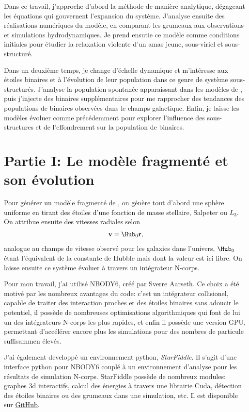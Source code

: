 Dans ce travail, j'approche d'abord la m\'ethode de mani\`ere analytique, d\'egageant les \'equations qui gouvernent l'expansion du syst\`eme. J'analyse ensuite des r\'ealisations num\'eriques du mod\`ele, en comparant les grumeaux aux observations et simulations hydrodynamiques. Je prend ensutie ce mod\`ele comme conditions initiales pour \'etudier la relaxation violente d'un amas jeune, sous-viriel et sous-structur\'e.

Dans un deuxi\`eme temps, je change d'\'echelle dynamique et m'int\'eresse aux \'etoiles binaires et \`a l'\'evolution de leur population dans ce genre de syst\`eme sous-structur\'es. J'analyse la population spontan\'ee apparaissant dans les mod\`eles de \HubLem, puis j'injecte des binaires suppl\'ementaires pour me rapprocher des tendances des populations de binaires observ\'ees dans le champs galactique. Enfin, je laisse les mod\`eles \'evoluer comme pr\'ec\'edemment pour explorer l'influence des sous-structures et de l'effondrement sur la population de binaires.


\section{Partie I: Le mod\`ele fragment\'e et son \'evolution}


Pour g\'en\'erer un mod\`ele fragment\'e de \HubLem, on g\'en\`ere tout d'abord une sph\`ere uniforme en tirant des \'etoiles d'une fonction de masse stellaire, Salpeter ou $L_3$. On attribue ensuite des vitesses radiales selon
\begin{equation}
\bold{v} = \Hub_0 \bold{r},
\end{equation}
analogue au champs de vitesse observ\'e pour les galaxies dans l'univers, $\Hub_0$ \'etant l'\'equivalent de la constante de Hubble mais dont la valeur est ici libre. On laisse ensuite ce syst\`eme \'evoluer \`a travers un int\'egrateur N-corps.

Pour mon travail, j'ai utilis\'e NBODY6, cr\'e\'e par Sverre Aarseth. Ce choix a \'et\'e motiv\'e par les nombreux avantages du code: c'est un int\'egrateur collisionel, capable de traiter des interaction proches et des \'etoiles binaires sans adoucir le potentiel, il poss\`ede de nombreuses optimisations algorithmiques qui font de lui un des int\'egrateurs N-corps les plus rapides, et enfin il poss\`ede une version GPU, permettant d'acc\'el\'erer encore plus les simulations pour des nombres de particule suffisammen \'elev\'es.

J'ai \'egalement developp\'e un environnement python, \textit{StarFiddle}. Il s'agit d'une interface python pour NBODY6 coupl\'e \`a un environnement d'analyse pour les r\'esultats de simulation N-corps. StarFiddle poss\`ede de nombreux modules: graphes 3d interactifs, calcul des \'energies \`a travers une librairie Cuda, d\'etection des \'etoiles binaires ou des grumeaux dans une simulation, etc. Il est disponible sur \href{https://github.com/dorvaljulien/StarFiddle}{GitHub}.

